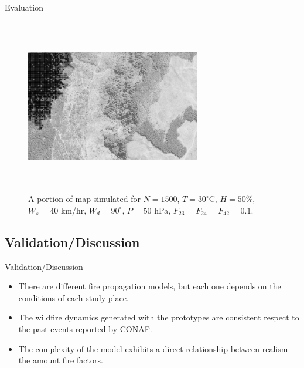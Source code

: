\documentclass{beamer}
\begin{document}
      \begin{frame}{Evaluation}
        \begin{figure}[!ht]
          \centering
          \includegraphics[width=3in,height=3in,clip,keepaspectratio]{figures/simulation_gray.png}
          \caption{A portion of map simulated for $N=1500$, $T=30^{\circ}$C, $H=50$\%, 
              $W_s=40$ km/hr, $W_d=90^{\circ}$, $P=50$ hPa, $F_{23} = F_{24}= F_{42} = 0.1$.}
          \label{fig:simulation}
        \end{figure}
      \end{frame}

      \subsection{Validation/Discussion}
        \begin{frame}{Validation/Discussion}
          \begin{itemize}
            \item<1-> There are different fire propagation models, but each one depends on the 
              conditions of each study place.
            \item<2-> The wildfire dynamics generated with the prototypes are consistent respect to the past events reported by CONAF.%
            \item<3-> The complexity of the model exhibits a direct relationship between realism the 
             amount fire factors. 
          \end{itemize}
        \end{frame}
      
\end{document}
